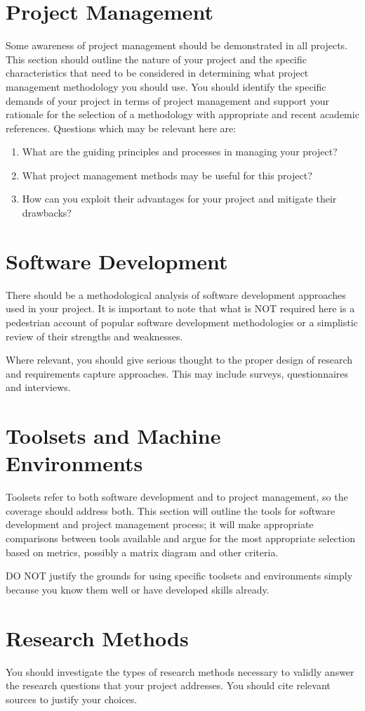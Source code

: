 \section{Project Management}
Some awareness of project management should be demonstrated in all projects. This section should outline the nature of your project and the specific characteristics that need to be considered in determining  what project management methodology you should use. You should identify the specific demands of your project in terms of project management and support your rationale for the selection of a methodology with appropriate and recent academic references. Questions which may be relevant here are:
\begin{enumerate}
    \item What are the guiding principles and processes in managing your project?
    \item What project management methods may be useful for this project?
    \item How can you exploit their advantages for your project and mitigate their drawbacks?
\end{enumerate}

\section{Software Development}
There should be a methodological analysis of software development approaches used in your project. It is important to note that what is NOT required here is a pedestrian account of popular software development methodologies or a simplistic review of their strengths and weaknesses. 

Where relevant, you should give serious thought to the proper design of research and requirements capture approaches. This may include surveys, questionnaires and interviews. 

\section{Toolsets and Machine Environments}
Toolsets refer to both software development and to project management, so the coverage should address both. This section will outline the tools for software development and project management process; it will make appropriate comparisons between tools available and argue for the most appropriate selection based on metrics, possibly a matrix diagram and other criteria.

DO NOT justify the grounds for using specific toolsets and environments simply because you know them well or have developed skills already. 

\section{Research Methods}
You should investigate the types of research methods necessary to validly answer the research questions that your project addresses. You should cite relevant sources to justify your choices.

